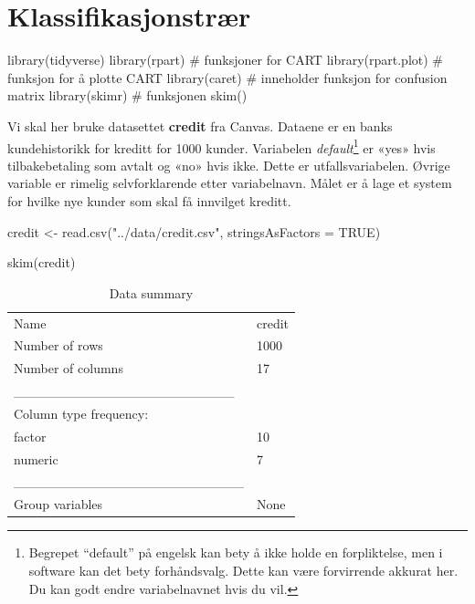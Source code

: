 \documentclass[
  letterpaper,
  DIV=11,
  numbers=noendperiod]{scrreprt}
\newenvironment{Shaded}{\begin{snugshade}}{\end{snugshade}}
\newcommand{\AttributeTok}[1]{\textcolor[rgb]{0.40,0.45,0.13}{#1}}
\newcommand{\CommentTok}[1]{\textcolor[rgb]{0.37,0.37,0.37}{#1}}
\newcommand{\ConstantTok}[1]{\textcolor[rgb]{0.56,0.35,0.01}{#1}}
\newcommand{\FunctionTok}[1]{\textcolor[rgb]{0.28,0.35,0.67}{#1}}
\newcommand{\NormalTok}[1]{\textcolor[rgb]{0.00,0.23,0.31}{#1}}
\newcommand{\OtherTok}[1]{\textcolor[rgb]{0.00,0.23,0.31}{#1}}
\newcommand{\StringTok}[1]{\textcolor[rgb]{0.13,0.47,0.30}{#1}}
\theoremstyle{definition}
\theoremstyle{remark}
\begin{document}

\hypertarget{klassifikasjonstruxe6r}{%
\chapter{Klassifikasjonstrær}\label{klassifikasjonstruxe6r}}

\begin{Shaded}
\begin{Highlighting}[]
\FunctionTok{library}\NormalTok{(tidyverse) }
\FunctionTok{library}\NormalTok{(rpart)      }\CommentTok{\# funksjoner for CART }
\FunctionTok{library}\NormalTok{(rpart.plot) }\CommentTok{\# funksjon for å plotte CART }
\FunctionTok{library}\NormalTok{(caret)      }\CommentTok{\# inneholder funksjon for confusion matrix }
\FunctionTok{library}\NormalTok{(skimr)      }\CommentTok{\# funksjonen skim()}
\end{Highlighting}
\end{Shaded}

Vi skal her bruke datasettet \textbf{credit} fra Canvas. Dataene er en
banks kundehistorikk for kreditt for 1000 kunder. Variabelen
\emph{default}\footnote{Begrepet ``default'' på engelsk kan bety å ikke
  holde en forpliktelse, men i software kan det bety forhåndsvalg. Dette
  kan være forvirrende akkurat her. Du kan godt endre variabelnavnet
  hvis du vil.} er «yes» hvis tilbakebetaling som avtalt og «no» hvis
ikke. Dette er utfallsvariabelen. Øvrige variable er rimelig
selvforklarende etter variabelnavn. Målet er å lage et system for hvilke
nye kunder som skal få innvilget kreditt.

\begin{Shaded}
\begin{Highlighting}[]
\NormalTok{credit }\OtherTok{\textless{}{-}} \FunctionTok{read.csv}\NormalTok{(}\StringTok{"../data/credit.csv"}\NormalTok{, }\AttributeTok{stringsAsFactors =} \ConstantTok{TRUE}\NormalTok{) }

\FunctionTok{skim}\NormalTok{(credit)}
\end{Highlighting}
\end{Shaded}

\begin{longtable}[]{@{}ll@{}}
\caption{Data summary}\tabularnewline
\toprule()
\endhead
Name & credit \\
Number of rows & 1000 \\
Number of columns & 17 \\
\_\_\_\_\_\_\_\_\_\_\_\_\_\_\_\_\_\_\_\_\_\_\_ & \\
Column type frequency: & \\
factor & 10 \\
numeric & 7 \\
\_\_\_\_\_\_\_\_\_\_\_\_\_\_\_\_\_\_\_\_\_\_\_\_ & \\
Group variables & None \\
\bottomrule()
\end{longtable}
\end{document}
